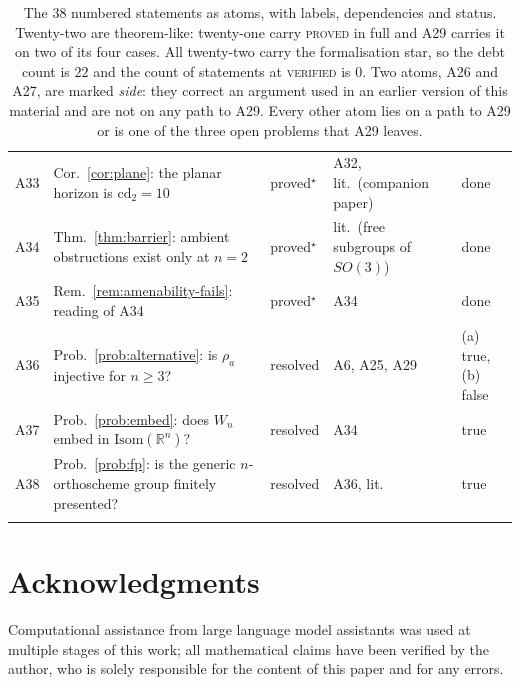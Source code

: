 \documentclass[11pt,a4paper]{article}
\newcommand{\R}{\mathbb{R}}
\newcommand{\Isom}{\mathrm{Isom}}
\newcommand{\cd}{\mathrm{cd}}
\theoremstyle{definition}
\theoremstyle{remark}
\theoremstyle{plain}
\begin{document}
\begin{longtable}{@{}l p{} p{} p{} p{}@{}}
A33 & Cor.~\ref{cor:plane}: the planar horizon is $\cd_2=10$ & proved$^\star$ & A32, lit.\ (companion paper) & done \\
A34 & Thm.~\ref{thm:barrier}: ambient obstructions exist only at $n=2$ & proved$^\star$ & lit.\ (free subgroups of $SO(3)$) & done \\
A35 & Rem.~\ref{rem:amenability-fails}: reading of A34 & proved$^\star$ & A34 & done \\
A36 & Prob.~\ref{prob:alternative}: is $\rho_a$ injective for $n\ge3$? & resolved \cite{Bonfioli3} & A6, A25, A29 & (a) true, (b) false \\
A37 & Prob.~\ref{prob:embed}: does $W_n$ embed in $\Isom(\R^n)$? & resolved \cite{Bonfioli3} & A34 & true \\
A38 & Prob.~\ref{prob:fp}: is the generic $n$-orthoscheme group finitely presented? & resolved \cite{Bonfioli3} & A36, lit.\ \cite{isola-piergallini} & true \\
\bottomrule
\caption{The $38$ numbered statements as atoms, with labels, dependencies and status.
Twenty-two are theorem-like: twenty-one carry \textsc{proved} in full and A29 carries it on two
of its four cases. All twenty-two carry the formalisation star, so the debt count is $22$ and
the count of statements at \textsc{verified} is $0$. Two atoms, A26 and A27, are marked
\emph{side}: they correct an argument used in an earlier version of this material and are not
on any path to A29. Every other atom lies on a path to A29 or is one of the three open problems
that A29 leaves.}
\label{tab:atoms}
\end{longtable}
\normalsize

\section*{Acknowledgments}

Computational assistance from large language model assistants was used at multiple stages of
this work; all mathematical claims have been verified by the author, who is solely responsible
for the content of this paper and for any errors.
\end{document}

